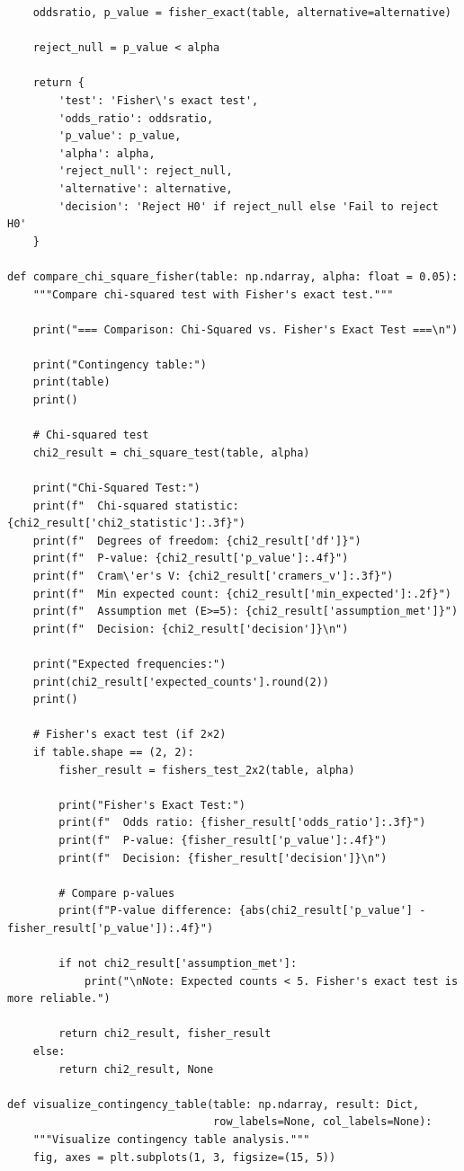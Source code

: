 \begin{lstlisting}
    oddsratio, p_value = fisher_exact(table, alternative=alternative)

    reject_null = p_value < alpha

    return {
        'test': 'Fisher\'s exact test',
        'odds_ratio': oddsratio,
        'p_value': p_value,
        'alpha': alpha,
        'reject_null': reject_null,
        'alternative': alternative,
        'decision': 'Reject H0' if reject_null else 'Fail to reject H0'
    }

def compare_chi_square_fisher(table: np.ndarray, alpha: float = 0.05):
    """Compare chi-squared test with Fisher's exact test."""

    print("=== Comparison: Chi-Squared vs. Fisher's Exact Test ===\n")

    print("Contingency table:")
    print(table)
    print()

    # Chi-squared test
    chi2_result = chi_square_test(table, alpha)

    print("Chi-Squared Test:")
    print(f"  Chi-squared statistic: {chi2_result['chi2_statistic']:.3f}")
    print(f"  Degrees of freedom: {chi2_result['df']}")
    print(f"  P-value: {chi2_result['p_value']:.4f}")
    print(f"  Cram\'er's V: {chi2_result['cramers_v']:.3f}")
    print(f"  Min expected count: {chi2_result['min_expected']:.2f}")
    print(f"  Assumption met (E>=5): {chi2_result['assumption_met']}")
    print(f"  Decision: {chi2_result['decision']}\n")

    print("Expected frequencies:")
    print(chi2_result['expected_counts'].round(2))
    print()

    # Fisher's exact test (if 2×2)
    if table.shape == (2, 2):
        fisher_result = fishers_test_2x2(table, alpha)

        print("Fisher's Exact Test:")
        print(f"  Odds ratio: {fisher_result['odds_ratio']:.3f}")
        print(f"  P-value: {fisher_result['p_value']:.4f}")
        print(f"  Decision: {fisher_result['decision']}\n")

        # Compare p-values
        print(f"P-value difference: {abs(chi2_result['p_value'] - fisher_result['p_value']):.4f}")

        if not chi2_result['assumption_met']:
            print("\nNote: Expected counts < 5. Fisher's exact test is more reliable.")

        return chi2_result, fisher_result
    else:
        return chi2_result, None

def visualize_contingency_table(table: np.ndarray, result: Dict,
                                row_labels=None, col_labels=None):
    """Visualize contingency table analysis."""
    fig, axes = plt.subplots(1, 3, figsize=(15, 5))


\end{lstlisting}
